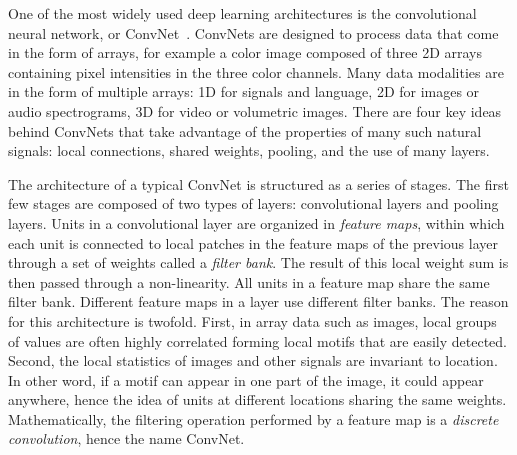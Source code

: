 \documentclass[10pts]{article}
\begin{document}


One of the most widely used deep learning architectures is the
convolutional neural network, or ConvNet~\cite{lecun-90c,lecun-98}. ConvNets
are designed to process data that come in the form of arrays, for
example a color image composed of three 2D arrays containing pixel
intensities in the three color channels. Many data modalities are in
the form of multiple arrays: 1D for signals and language, 2D for
images or audio spectrograms, 3D for video or volumetric images.
There are four key ideas behind ConvNets that take advantage of the
properties of many such natural signals: local connections, shared
weights, pooling, and the use of many layers.

The architecture of a typical ConvNet is 
structured as a series of stages. The first few stages are composed of two
types of layers: convolutional layers and pooling layers. Units in a
convolutional layer are organized in {\em feature maps}, within which
each unit is connected to local patches in the feature maps of the
previous layer through a set of weights called a {\em filter
  bank}. The result of this local weight sum is then passed through a
non-linearity.  All units in a feature map share the same filter
bank. Different feature maps in a layer use different filter banks. The
reason for this architecture is twofold. First, in array data such as
images, local groups of values are often highly correlated forming
local motifs that are easily detected. Second, the local statistics of
images and other signals are invariant to location. In other word, if
a motif can appear in one part of the image, it could appear anywhere,
hence the idea of units at different locations sharing the same
weights.  Mathematically, the filtering operation performed by a
feature map is a {\em discrete convolution}, hence the name
ConvNet. 
\end{document}
